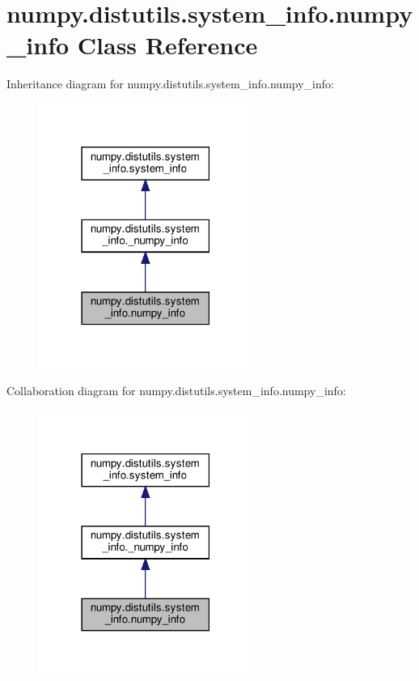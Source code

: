 \hypertarget{classnumpy_1_1distutils_1_1system__info_1_1numpy__info}{}\section{numpy.\+distutils.\+system\+\_\+info.\+numpy\+\_\+info Class Reference}
\label{classnumpy_1_1distutils_1_1system__info_1_1numpy__info}


Inheritance diagram for numpy.\+distutils.\+system\+\_\+info.\+numpy\+\_\+info\+:
\nopagebreak
\begin{figure}[H]
\begin{center}
\leavevmode
\includegraphics[width=198pt]{classnumpy_1_1distutils_1_1system__info_1_1numpy__info__inherit__graph}
\end{center}
\end{figure}


Collaboration diagram for numpy.\+distutils.\+system\+\_\+info.\+numpy\+\_\+info\+:
\nopagebreak
\begin{figure}[H]
\begin{center}
\leavevmode
\includegraphics[width=198pt]{classnumpy_1_1distutils_1_1system__info_1_1numpy__info__coll__graph}
\end{center}
\end{figure}
